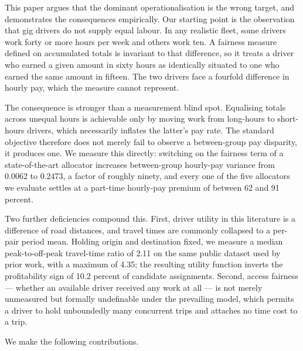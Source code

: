\documentclass[10pt,twocolumn]{article}
\begin{document}
This paper argues that the dominant operationalisation is the wrong target, and demonstrates the consequences empirically. Our starting point is the observation that gig drivers do not supply equal labour. In any realistic fleet, some drivers work forty or more hours per week and others work ten. A fairness measure defined on accumulated totals is invariant to that difference, so it treats a driver who earned a given amount in sixty hours as identically situated to one who earned the same amount in fifteen. The two drivers face a fourfold difference in hourly pay, which the measure cannot represent.

The consequence is stronger than a measurement blind spot. Equalising totals across unequal hours is achievable only by moving work from long-hours to short-hours drivers, which necessarily inflates the latter's pay rate. The standard objective therefore does not merely fail to observe a between-group pay disparity, it produces one. We measure this directly: switching on the fairness term of a state-of-the-art allocator increases between-group hourly-pay variance from 0.0062 to 0.2473, a factor of roughly ninety, and every one of the five allocators we evaluate settles at a part-time hourly-pay premium of between 62 and 91 percent.

Two further deficiencies compound this. First, driver utility in this literature is a difference of road distances, and travel times are commonly collapsed to a per-pair period mean. Holding origin and destination fixed, we measure a median peak-to-off-peak travel-time ratio of 2.11 on the same public dataset used by prior work, with a maximum of 4.35; the resulting utility function inverts the profitability sign of 10.2 percent of candidate assignments. Second, access fairness --- whether an available driver received any work at all --- is not merely unmeasured but formally undefinable under the prevailing model, which permits a driver to hold unboundedly many concurrent trips and attaches no time cost to a trip.

We make the following contributions.
\end{document}
